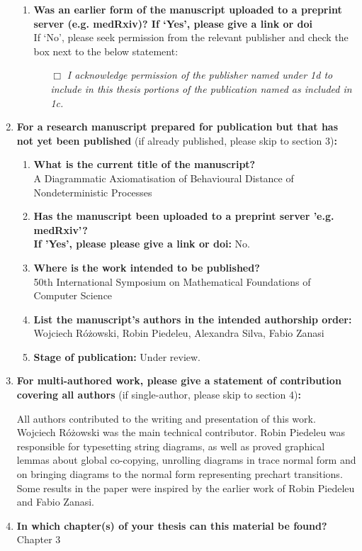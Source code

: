 \begin{enumerate}
\begin{enumerate}
			\item \textbf{Was an earlier form of the manuscript uploaded to a preprint server (e.g. medRxiv)? If ‘Yes’, please give a link or doi}
			\\
			If ‘No’, please seek permission from the relevant publisher and check the box next to the below statement:
%			
			\begin{itemize}\itemsep0em
				\item[$\Box$] {\itshape I acknowledge permission of the publisher named under 1d to include in this thesis portions of the publication named as included in 1c.}
			\end{itemize}
%		
		\end{enumerate}
%	
		\item \textbf{For a research manuscript prepared for publication but that has not yet been published} (if already published, please skip to section 3)\textbf{:}
%		
		\begin{enumerate}\itemsep0em
			\item \textbf{What is the current title of the manuscript?}\\
			A Diagrammatic Axiomatisation of Behavioural Distance of Nondeterministic Processes
			\item \textbf{Has the manuscript been uploaded to a preprint server 'e.g. medRxiv'? 
			\\
			If 'Yes', please please give a link or doi:}
			No.
			\item \textbf{Where is the work intended to be published?}\\
			50th International Symposium on Mathematical Foundations of Computer Science
			\item \textbf{List the manuscript's authors in the intended authorship order:}
			Wojciech R\'{o}\.{z}owski, Robin Piedeleu, Alexandra Silva, Fabio Zanasi
			\item \textbf{Stage of publication:}
			Under review.
		\end{enumerate}
		
		\item \textbf{For multi-authored work, please give a statement of contribution covering all authors} (if single-author, please skip to section 4)\textbf{:}
		
		All authors  contributed to the writing and presentation of this work.
		Wojciech R\'{o}\.{z}owski was the main technical contributor. Robin Piedeleu was responsible for typesetting string diagrams, as well as proved graphical lemmas about global co-copying, unrolling diagrams in trace normal form and on bringing diagrams to the normal form representing prechart transitions. Some results in the paper were inspired by the earlier work of Robin Piedeleu and Fabio Zanasi.


		\item \textbf{In which chapter(s) of your thesis can this material be found?}\\
		Chapter 3
	\end{enumerate}

